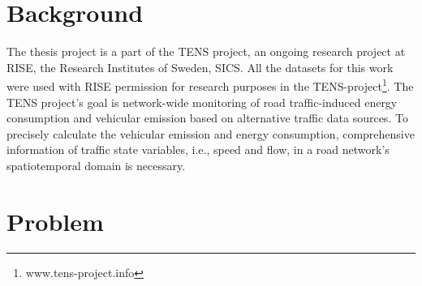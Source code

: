 \documentclass[english]{kththesis}
\begin{document}
\section{Background}
\label{sec:background}
\renewcommand{\thefootnote}{\arabic{footnote}}
The thesis project is a part of the TENS project, an ongoing research project at RISE, the Research Institutes of Sweden, SICS. All the datasets for this work were used with RISE permission for research purposes in the TENS-project\footnote{www.tens-project.info}. The TENS project's goal is network-wide monitoring of road traffic-induced energy consumption and vehicular emission based on alternative traffic data sources. To precisely calculate the vehicular emission and energy consumption, comprehensive information of traffic state variables, i.e., speed and flow, in a road network's spatiotemporal domain is necessary.

\section{Problem}
\end{document}
